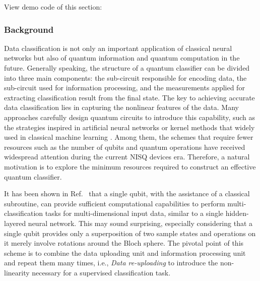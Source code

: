 View demo code of this section: 

\subsubsection{Background}


Data classification is not only an important application of classical neural networks but also of quantum information and quantum computation in the future. Generally speaking, the structure of a quantum classifier can be divided into three main components: the sub-circuit responsible for encoding data, the sub-circuit used for information processing, and the measurements applied for extracting classification result from the final state.
The key to achieving accurate data classification lies in capturing the nonlinear features of the data. Many approaches carefully design quantum circuits to introduce this capability, such as the strategies inspired in artificial neural networks or kernel methods that widely used in classical machine learning \cite{PhysRevLett.122.040504, 2019Supervised_nature, Wan_2017_npjqi, hur2022quantum, chalumuri2021hybrid, oh2020tutorial, farhi2018classification, wrobel2021application}. Among them, the schemes that require fewer resources such as the number of qubits and quantum operations have received widespread attention during the current NISQ devices era.
Therefore, a natural motivation is to explore the minimum resources required to construct an effective quantum classifier.

It has been shown in Ref.~\cite{PerezSalinas2020datareuploading} that a single qubit, with the assistance of a classical subroutine, can provide sufficient computational capabilities to perform multi-classification tasks for multi-dimensional input data, similar to a single hidden-layered neural network. This may sound surprising, especially considering that a single qubit provides only a superposition of two sample states and operations on it merely involve rotations around the Bloch sphere.
The pivotal point of this scheme is to combine the data uploading unit and information processing unit and repeat them many times, i.e., \textit{Data re-uploading} to introduce the non-linearity necessary for a supervised classification task.

